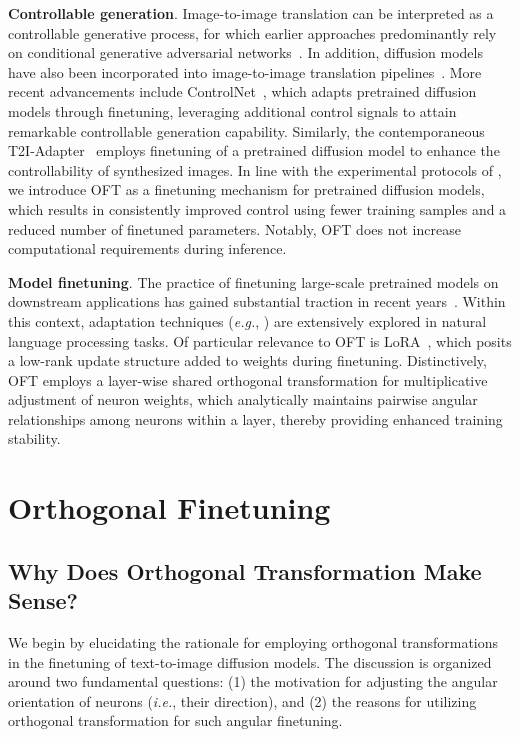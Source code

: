\textbf{Controllable generation}. Image-to-image translation can be interpreted as a controllable generative process, for which earlier approaches predominantly rely on conditional generative adversarial networks~\cite{isola2017image,zhu2017toward,wang2018high,park2019semantic,choi2018stargan}. In addition, diffusion models have also been incorporated into image-to-image translation pipelines~\cite{saharia2022palette,voynov2022sketch,wang2022pretraining}. More recent advancements include ControlNet~\cite{zhang2023adding}, which adapts pretrained diffusion models through finetuning, leveraging additional control signals to attain remarkable controllable generation capability. Similarly, the contemporaneous T2I-Adapter~\cite{mou2023t2i} employs finetuning of a pretrained diffusion model to enhance the controllability of synthesized images. In line with the experimental protocols of \cite{zhang2023adding,mou2023t2i}, we introduce OFT as a finetuning mechanism for pretrained diffusion models, which results in consistently improved control using fewer training samples and a reduced number of finetuned parameters. Notably, OFT does not increase computational requirements during inference.

\textbf{Model finetuning}. The practice of finetuning large-scale pretrained models on downstream applications has gained substantial traction in recent years~\cite{devlin2018bert,brown2020language,he2022masked}. Within this context, adaptation techniques (\emph{e.g.}, \cite{hulora2022,houlsby2019parameter,pfeiffer2020adapterfusion}) are extensively explored in natural language processing tasks. Of particular relevance to OFT is LoRA~\cite{hulora2022}, which posits a low-rank update structure added to weights during finetuning. Distinctively, OFT employs a layer-wise shared orthogonal transformation for multiplicative adjustment of neuron weights, which analytically maintains pairwise angular relationships among neurons within a layer, thereby providing enhanced training stability.

\section{Orthogonal Finetuning}

\subsection{Why Does Orthogonal Transformation Make Sense?}

We begin by elucidating the rationale for employing orthogonal transformations in the finetuning of text-to-image diffusion models. The discussion is organized around two fundamental questions: (1) the motivation for adjusting the angular orientation of neurons (\emph{i.e.}, their direction), and (2) the reasons for utilizing orthogonal transformation for such angular finetuning.

